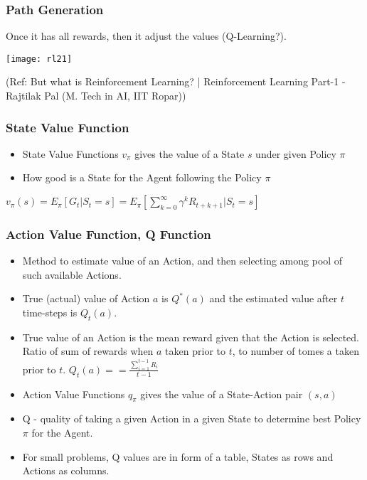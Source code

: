 \begin{frame}[fragile]\frametitle{Path Generation}

Once it has all rewards, then it adjust the values (Q-Learning?).

\begin{center}
\texttt{[image: rl21]}
\end{center}


{\tiny (Ref: But what is Reinforcement Learning? | Reinforcement Learning Part-1 - Rajtilak Pal (M. Tech in AI, IIT Ropar))}

\end{frame}

\begin{frame}[fragile]\frametitle{State Value Function}

\begin{itemize}
\item State Value Functions $v_{\pi}$ gives the value of a State $s$ under given Policy $\pi$
\item How good is a State for the Agent following the Policy $\pi$
\end{itemize}

$v_{\pi}(s) = E_{\pi}[G_t | S_t = s] = E_{\pi}[\sum_{k=0}^{\infty}\gamma^kR_{t+k+1}|S_t=s]$

\end{frame}

\begin{frame}[fragile]\frametitle{Action Value Function, Q Function}

\begin{itemize}
\item Method to estimate value of an Action, and then selecting among pool of such available Actions.
\item True (actual) value of Action $a$ is $Q^*(a)$ and the estimated value after $t$ time-steps is $Q_t(a)$.
\item True value of an Action is the mean reward given that the Action is selected. Ratio of sum of rewards when $a$ taken prior to $t$, to number of tomes a taken prior to $t$. $Q_t(a) = = \frac{\sum_{i=1}^{t-1} R_i}{t-1}$
\item Action Value Functions $q_{\pi}$ gives the value of a State-Action pair $(s,a)$ 
\item Q - quality of taking a given Action in a given State to determine best Policy $\pi$ for the Agent.
\item For small problems, Q values are in form of a table, States as rows and Actions as columns.
\end{itemize}

\end{frame}


